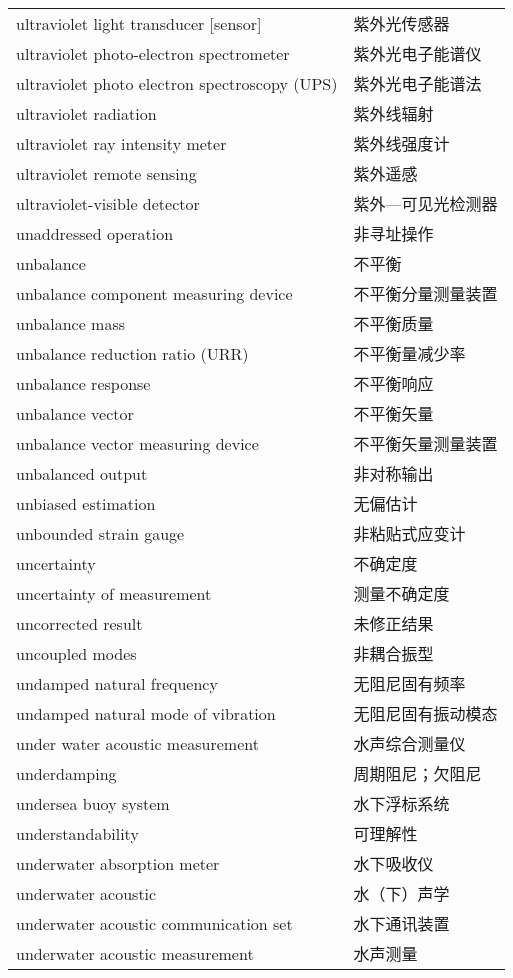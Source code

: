 \documentclass[
]{article}
\begin{document}
\begin{longtable}[]{@{}ll@{}}
ultraviolet light transducer {[}sensor{]} & 紫外光传感器 \\
ultraviolet photo-electron spectrometer & 紫外光电子能谱仪 \\
ultraviolet photo electron spectroscopy (UPS) & 紫外光电子能谱法 \\
ultraviolet radiation & 紫外线辐射 \\
ultraviolet ray intensity meter & 紫外线强度计 \\
ultraviolet remote sensing & 紫外遥感 \\
ultraviolet-visible detector & 紫外---可见光检测器 \\
unaddressed operation & 非寻址操作 \\
unbalance & 不平衡 \\
unbalance component measuring device & 不平衡分量测量装置 \\
unbalance mass & 不平衡质量 \\
unbalance reduction ratio (URR) & 不平衡量减少率 \\
unbalance response & 不平衡响应 \\
unbalance vector & 不平衡矢量 \\
unbalance vector measuring device & 不平衡矢量测量装置 \\
unbalanced output & 非对称输出 \\
unbiased estimation & 无偏估计 \\
unbounded strain gauge & 非粘贴式应变计 \\
uncertainty & 不确定度 \\
uncertainty of measurement & 测量不确定度 \\
uncorrected result & 未修正结果 \\
uncoupled modes & 非耦合振型 \\
undamped natural frequency & 无阻尼固有频率 \\
undamped natural mode of vibration & 无阻尼固有振动模态 \\
under water acoustic measurement & 水声综合测量仪 \\
underdamping & 周期阻尼；欠阻尼 \\
undersea buoy system & 水下浮标系统 \\
understandability & 可理解性 \\
underwater absorption meter & 水下吸收仪 \\
underwater acoustic & 水（下）声学 \\
underwater acoustic communication set & 水下通讯装置 \\
underwater acoustic measurement & 水声测量 \\

\end{longtable}
\end{document}
